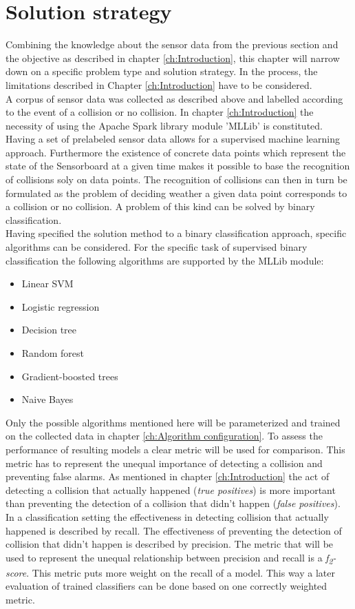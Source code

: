 \section{Solution strategy}
\label{sec:Solution strategy}
Combining the knowledge about the sensor data from the previous section and the objective as described in chapter \ref{ch:Introduction}, this chapter will narrow down on a specific problem type and solution strategy. In the process, the limitations described in Chapter \ref{ch:Introduction} have to be considered. \\
A corpus of sensor data was collected as described above and labelled according to the event of a collision or no collision. In chapter \ref{ch:Introduction}  the necessity of using the Apache Spark library module 'MLLib' is constituted.
\\ 
Having a set of prelabeled sensor data allows for a supervised machine learning approach.  Furthermore the existence of concrete data points which represent the state of the Sensorboard at a given time makes it possible to base the recognition of collisions soly on data points. The recognition of collisions can then in turn be formulated as the problem of deciding weather a given data point corresponds to a collision or no collision. A problem of this kind can be solved by binary classification. \\
Having specified the solution method to a binary classification approach, specific algorithms can be considered. For the specific task of supervised binary classification the following algorithms are supported by the MLLib module:

\begin{itemize}
\item Linear SVM
\item Logistic regression
\item Decision tree
\item Random forest
\item Gradient-boosted trees
\item Naive Bayes
\end{itemize}

Only the possible algorithms mentioned here will be parameterized and trained on the  collected data in chapter \ref{ch:Algorithm configuration}.   \newline
To assess the performance of resulting models a clear metric will be used for comparison. This metric has to represent the unequal importance of detecting a collision and preventing false alarms. As mentioned in chapter \ref{ch:Introduction} the act of detecting a collision that actually happened (\emph{true positives}) is more important than preventing the detection of a collision that didn't happen (\emph{false positives}). In a classification setting the effectiveness in detecting collision that actually happened is described by recall. The effectiveness of preventing the detection of collision that didn't happen is described by precision. The metric that will be used to represent the unequal relationship between precision and recall is a\emph{ f\textsubscript{2}-score}. This metric puts more weight on the recall of a model. This way a later evaluation of trained classifiers can be done based on one correctly weighted metric.